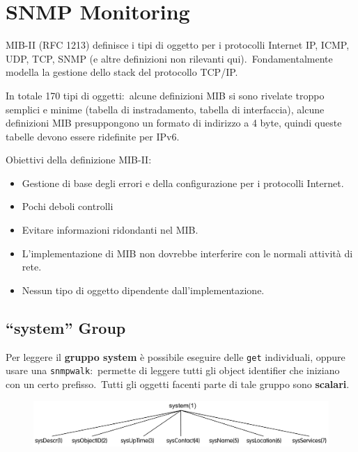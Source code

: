 \chapter{SNMP Monitoring}

MIB-II (RFC 1213) definisce i tipi di oggetto per i protocolli Internet IP, ICMP, UDP, TCP, SNMP (e altre definizioni non rilevanti qui).\
Fondamentalmente modella la gestione dello stack del protocollo TCP/IP.\

In totale 170 tipi di oggetti:\ alcune definizioni MIB si sono rivelate troppo semplici e minime (tabella di instradamento, tabella di interfaccia), alcune definizioni MIB presuppongono un formato di indirizzo a 4 byte, quindi queste tabelle devono essere ridefinite per IPv6.

\noindent Obiettivi della definizione MIB-II:
\begin{itemize}
    \item Gestione di base degli errori e della configurazione per i protocolli Internet.\
    \item Pochi deboli controlli
    \item Evitare informazioni ridondanti nel MIB.
    \item L'implementazione di MIB non dovrebbe interferire con le normali attività di rete.
    \item Nessun tipo di oggetto dipendente dall'implementazione.
\end{itemize}

\section{``system'' Group}

Per leggere il \textbf{gruppo system} è possibile eseguire delle \texttt{get} individuali, oppure usare una \texttt{snmpwalk}:\ permette di leggere tutti gli object identifier che iniziano con un certo prefisso.\
Tutti gli oggetti facenti parte di tale gruppo sono \textbf{scalari}.\

\begin{figure}[H]
    \centering
    \includegraphics[width=\textwidth]{immagini/system_group.png}
\end{figure}

